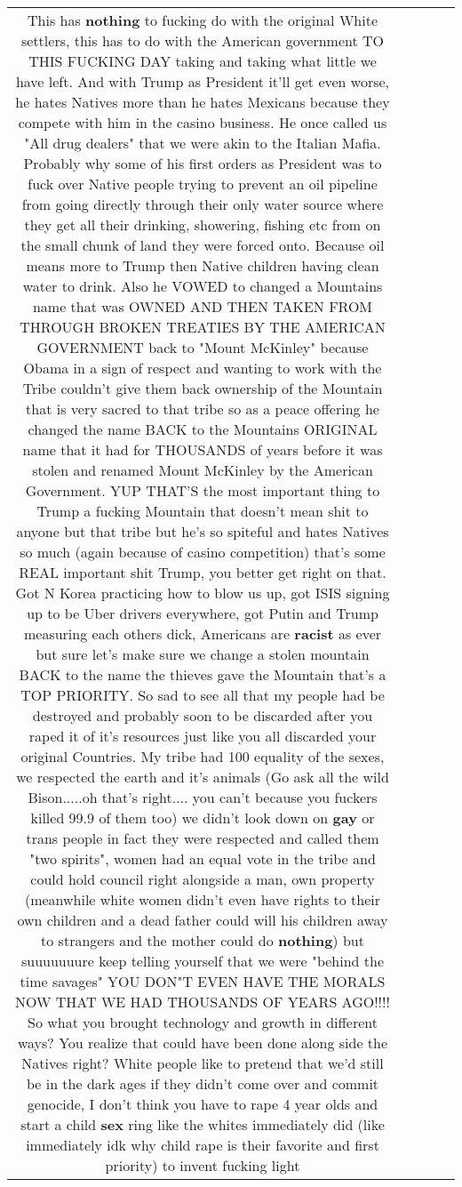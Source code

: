 \documentclass[11pt]{article}
\newlength\mylength
\begin{document}
\begin{center}
\begin{longtable}{|C{.65\mylength}|C{.30\mylength}|C{.12\mylength}|C{.12\mylength}|C{.12\mylength}|}
  \small This has \textbf{nothing} to fucking do with the original White settlers, this has to do with the American government TO THIS FUCKING DAY taking and taking what little we have left. And with Trump as President it'll get even worse, he hates Natives more than he hates Mexicans because they compete with him in the casino business. He once called us "All drug dealers" that we were akin to the Italian Mafia. Probably why some of his first orders as President was to fuck over Native people trying to prevent an oil pipeline from going directly through their only water source where they get all their drinking, showering, fishing etc from  on the small chunk of land they were forced onto. Because oil means more to Trump then Native children having clean water to drink. Also he VOWED to changed a Mountains name that was OWNED AND THEN TAKEN FROM THROUGH BROKEN TREATIES BY THE AMERICAN GOVERNMENT back to "Mount McKinley" because Obama in a sign of respect and wanting to work with the Tribe couldn't give them back ownership of the Mountain that is very sacred to that tribe so as a peace offering he changed the name BACK to the Mountains ORIGINAL name that it had for THOUSANDS of years before it was stolen and renamed Mount McKinley by the American Government. YUP THAT'S the most important thing to Trump a fucking Mountain that doesn't mean shit to anyone but that tribe but he's so spiteful and hates Natives so much (again because of casino competition) that's some REAL important shit Trump, you better get right on that. Got N Korea practicing how to blow us up, got ISIS signing up to be Uber drivers everywhere, got Putin and Trump measuring each others dick, Americans are \textbf{racist} as ever but sure let's make sure we change a stolen mountain BACK to the name the thieves gave the Mountain that's a TOP PRIORITY.  So sad to see all that my people had be destroyed and probably soon to be discarded after you raped it of it's resources just like you all discarded your original Countries. My tribe had 100 equality of the sexes, we respected the earth and it's animals (Go ask all the wild Bison.....oh that's right.... you can't because you fuckers killed 99.9 of them too) we didn't look down on \textbf{g\textbf{ay}} or trans people in fact they were respected and called them "two spirits", women had an equal vote in the tribe and could hold council right alongside a man, own property (meanwhile white women didn't even have rights to their own children and a dead father could will his children away to strangers and the mother could do \textbf{nothing}) but suuuuuuure keep telling yourself that we were "behind the time savages" YOU DON"T EVEN HAVE THE MORALS NOW THAT WE HAD THOUSANDS OF YEARS AGO!!!! So what you brought technology and growth in different ways? You realize that could have been done along side the Natives right? White people like to pretend that we'd still be in the dark ages if they didn't come over and commit genocide, I don't think you have to rape 4 year olds and start a child \textbf{sex} ring like the whites immediately did (like immediately idk why child rape is their favorite and first priority) to invent fucking light  
\end{longtable}
\end{center}
\end{document}
